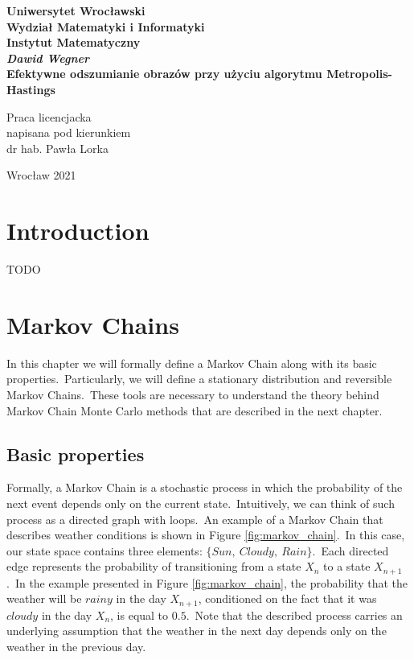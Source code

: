 \documentclass[a4paper, 11pt, onecolumn, openany, titlepage]{report}
\newcommand\blankpage{\null\thispagestyle{empty}\newpage}
\newcommand\numberedchapter[1]{\setlength\topskip{3cm}\chapter{#1}\setlength\topskip{0cm}}
\newcommand\unnumberedchapter[1]{\setlength\topskip{3cm}\chapter*{#1}\setlength\topskip{0cm}}
\theoremstyle{default_theorem_style}\newtheorem{theorem}{Theorem}
\theoremstyle{default_theorem_style}\newtheorem{definition}{Definition}
\begin{document}
\setlength\topskip{3cm}
\newpage
\thispagestyle{empty}
\begin{center}
\textbf{\large Uniwersytet Wrocławski\\
Wydział Matematyki i Informatyki\\
Instytut Matematyczny}\\
\vspace{4cm}
\textbf{\textit{\large Dawid Wegner}\\
\vspace{0.5cm}
{\Large Efektywne odszumianie obrazów przy użyciu algorytmu Metropolis-Hastings}}\\
\end{center}
\vspace{3cm}
{\large \hspace*{6.5cm}Praca licencjacka\\
\hspace*{6.5cm}napisana pod kierunkiem\\
\hspace*{6.5cm}dr hab. Pawła Lorka}\\
\vfill
\begin{center}
{\large Wrocław 2021}\\
\end{center}
\setlength\topskip{0cm}
\afterpage{\blankpage}

{\hypersetup{linkcolor=black}
\setlength\topskip{3cm}
\tableofcontents
\setlength\topskip{0cm}
}

\unnumberedchapter{Introduction}

TODO

\numberedchapter{Markov Chains}

In this chapter we will formally define a Markov Chain along with its basic properties.\ Particularly, we will define
a stationary distribution and reversible Markov Chains.\ These tools are necessary to understand the theory behind
Markov Chain Monte Carlo methods that are described in the next chapter.

\section{Basic properties}

Formally, a Markov Chain is a stochastic process in which the probability of the next event depends only on the current
state.\ Intuitively, we can think of such process as a directed graph with loops.\ An example of a Markov Chain that
describes weather conditions is shown in Figure \ref{fig:markov_chain}.\ In this case, our state space contains three
elements: $\{Sun,\ Cloudy,\ Rain\}$.\ Each directed edge represents the probability of transitioning from a state
$X_{n}$ to a state $X_{n + 1}$.\ In the example presented in Figure \ref{fig:markov_chain}, the probability that the
weather will be $rainy$ in the day $X_{n + 1}$, conditioned on the fact that it was $cloudy$ in the day $X_n$, is
equal to $0.5$.\ Note that the described process carries an underlying assumption that the weather in the next
day depends only on the weather in the previous day.
\end{document}
